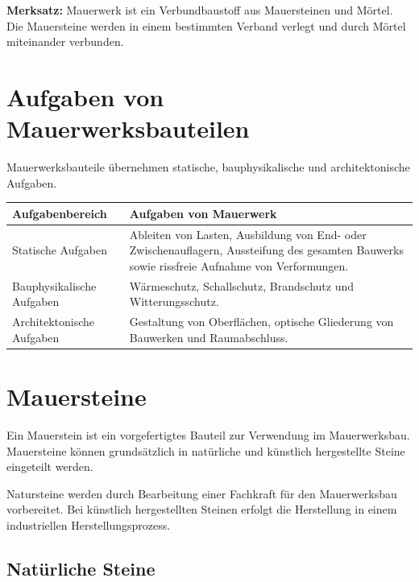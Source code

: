 \documentclass[
  12pt,
  a4paper,
  oneside
]{scrreprt}
\begin{document}
\begin{merksatzbox}
\textbf{Merksatz:}
Mauerwerk ist ein Verbundbaustoff aus Mauersteinen und Mörtel. Die
Mauersteine werden in einem bestimmten Verband verlegt und durch Mörtel
miteinander verbunden.

\end{merksatzbox}

\section{Aufgaben von Mauerwerksbauteilen}

Mauerwerksbauteile übernehmen statische, bauphysikalische und
architektonische Aufgaben.

\begin{longtable}{
  >{\raggedright\arraybackslash}p{}
  >{\raggedright\arraybackslash}p{}
}
\toprule
\textbf{Aufgabenbereich} &
\textbf{Aufgaben von Mauerwerk} \\
\midrule
\endhead

Statische Aufgaben &
Ableiten von Lasten, Ausbildung von End- oder Zwischenauflagern,
Aussteifung des gesamten Bauwerks sowie rissfreie Aufnahme von
Verformungen. \\

Bauphysikalische Aufgaben &
Wärmeschutz, Schallschutz, Brandschutz und Witterungsschutz. \\

Architektonische Aufgaben &
Gestaltung von Oberflächen, optische Gliederung von Bauwerken und
Raumabschluss. \\

\bottomrule
\end{longtable}



\section{Mauersteine}

Ein Mauerstein ist ein vorgefertigtes Bauteil zur Verwendung im
Mauerwerksbau. Mauersteine können grundsätzlich in natürliche und
künstlich hergestellte Steine eingeteilt werden.


Natursteine werden durch Bearbeitung einer Fachkraft für den
Mauerwerksbau vorbereitet. Bei künstlich hergestellten Steinen erfolgt
die Herstellung in einem industriellen Herstellungsprozess.


\subsection{Natürliche Steine}
\end{document}
